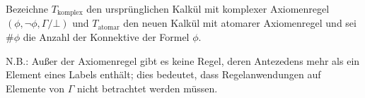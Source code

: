 \newcommand{\Tk}{T_\text{komplex}}
\newcommand{\Ta}{T_\text{atomar}}

Bezeichne $\Tk$ den ursprünglichen Kalkül mit komplexer Axiomenregel $(\phi, \neg \phi, \Gamma / \bot)$ und $\Ta$ den
neuen Kalkül mit atomarer Axiomenregel und sei $\#\phi$ die Anzahl der Konnektive der Formel $\phi$.

N.B.: Außer der Axiomenregel gibt es keine Regel, deren Antezedens mehr als ein Element eines Labels enthält; dies
bedeutet, dass Regelanwendungen auf Elemente von $\Gamma$ nicht betrachtet werden müssen.

